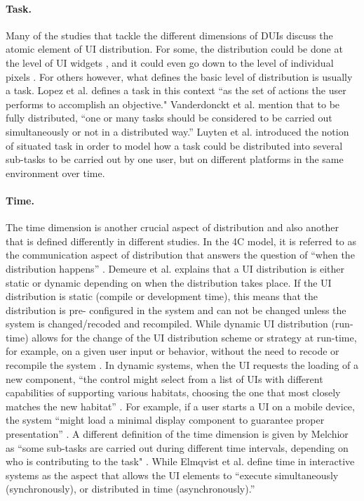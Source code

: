 \paragraph{Task.} Many of the studies that tackle the different dimensions of
DUIs discuss the atomic element of UI distribution. For some, the distribution
could be done at the level of UI widgets \cite{vanderdonckt2010distributed}, and
it could even go down to the level of individual pixels \cite{demeure20084c}.
For others however, what defines the basic level of distribution is usually a
task. Lopez et al. \cite{lopez2011formal} defines a task in this context ``as the
set of actions the user performs to accomplish an objective."
Vanderdonckt et al. \cite{vanderdonckt2010distributed} mention that 
to be fully distributed, ``one or many tasks should be considered to be
carried out simultaneously or not in a distributed way.''  Luyten et al.
\cite{luyten2006designing} introduced the notion of situated task in order to model how a task
could be distributed into several sub-tasks to be carried out by one user, but on different platforms in the same environment
over time.

\paragraph{Time.} The time dimension is another crucial aspect of distribution
and also another that is defined differently in different studies. In the 4C
model, it is referred to as the communication aspect of distribution that
answers the question of ``when the distribution happens'' \cite{demeure20084c}.
Demeure et al. explains that a UI distribution is either static or dynamic
depending on when the distribution takes place. If the UI distribution is
static (compile or development time), this means that the distribution is pre-
configured in the system and can not be changed unless the system is
changed/recoded and recompiled. While dynamic UI distribution (run-time) allows
for the change of the UI distribution scheme or strategy at run-time, for
example, on a given user input or behavior, without the need to recode or
recompile the system \cite{demeure20084c}. In dynamic systems,
when the UI requests the loading of a new component, ``the control might select
from a list of UIs with different capabilities of supporting various habitats,
choosing the one that most closely matches the new habitat'' \cite{demeure20084c}.
For example, if a user starts a UI on a mobile device, the system ``might
load a minimal display component to guarantee proper presentation''
\cite{demeure20084c}. A different definition of the time dimension is given by
Melchior as ``some sub-tasks are carried out during different time intervals,
depending on who is contributing to the task" \cite{melchior2011distributed}. While Elmqvist et al.
\cite{elmqvist2011distributed} define time in interactive systems as the
aspect that allows the UI elements to ``execute simultaneously
(synchronously), or distributed in time (asynchronously).''

